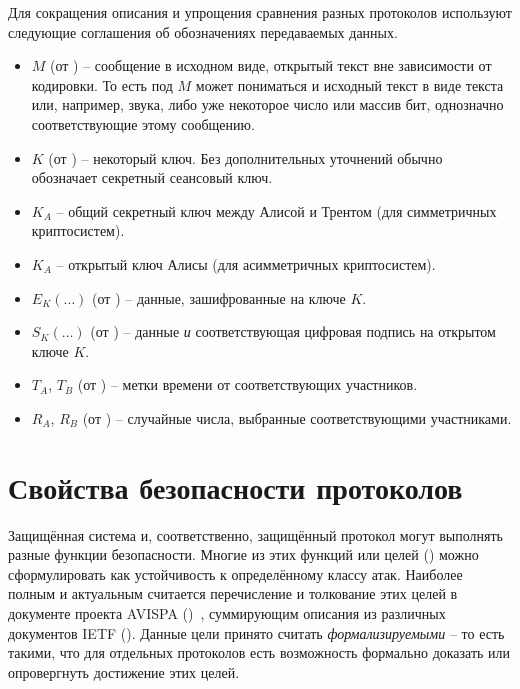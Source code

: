 Для сокращения описания и упрощения сравнения разных протоколов используют следующие соглашения об обозначениях передаваемых данных.

\begin{itemize}
	\item $M$ (от ) -- сообщение в исходном виде, открытый текст вне зависимости от кодировки. То есть под $M$ может пониматься и исходный текст в виде текста или, например, звука, либо уже некоторое число или массив бит, однозначно соответствующие этому сообщению.
	\item $K$ (от ) -- некоторый ключ. Без дополнительных уточнений обычно обозначает секретный сеансовый ключ.
	\item $K_A$ -- общий секретный ключ между Алисой и Трентом (для симметричных криптосистем).
	\item $K_A$ -- открытый ключ Алисы (для асимметричных криптосистем).
	\item $E_K \left( \dots \right)$ (от ) -- данные, зашифрованные на ключе $K$.
	\item $S_K \left( \dots \right)$ (от ) -- данные \emph{и} соответствующая цифровая подпись на открытом ключе $K$.
	\item $T_A$, $T_B$ (от ) -- метки времени от соответствующих участников.
	\item $R_A$, $R_B$ (от ) -- случайные числа, выбранные соответствующими участниками.
\end{itemize}

\section{Свойства безопасности протоколов}
Защищённая система и, соответственно, защищённый протокол могут выполнять разные функции безопасности. Многие из этих функций или целей () можно сформулировать как устойчивость к определённому классу атак. Наиболее полным и актуальным считается перечисление и толкование этих целей в документе проекта AVISPA ()~\cite{AVISPA:2003}, суммирующим описания из различных документов IETF (). Данные цели принято считать \emph{формализируемыми} -- то есть такими, что для отдельных протоколов есть возможность формально доказать или опровергнуть достижение этих целей.

